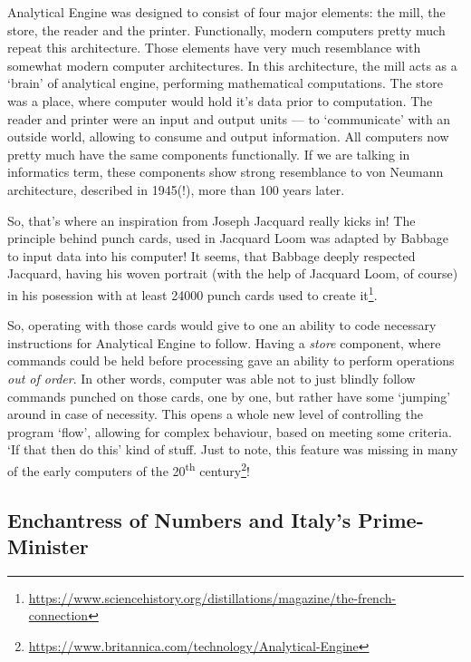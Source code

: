 \documentclass[../../what-is-computer]{subfiles}
\begin{document}
    Analytical Engine was designed to consist of four major elements: the mill, the store, the reader and the printer. Functionally, modern computers pretty much
    repeat this architecture. Those elements have very much resemblance with somewhat modern computer architectures. In this architecture, the mill acts as a `brain'
    of analytical engine, performing mathematical computations. The store was a place, where computer would hold it's data prior to computation. The reader and printer
    were an input and output units --- to `communicate' with an outside world, allowing to consume and output information. All computers now pretty much have the same 
    components functionally. If we are talking in informatics term, these components show strong resemblance to von Neumann architecture, described in 1945(!), more than
    100 years later. \par

    So, that's where an inspiration from Joseph Jacquard really kicks in! The principle behind punch cards, used in Jacquard Loom was adapted by Babbage to input data
    into his computer! It seems, that Babbage deeply respected Jacquard, having his woven portrait (with the help of Jacquard Loom, of course) in his 
    posession with at least \num{24000} punch cards used to create it\footnote{\href{https://www.sciencehistory.org/distillations/magazine/the-french-connection}
    {https://www.sciencehistory.org/distillations/magazine/the-french-connection}}. \par

    So, operating with those cards would give to one an ability to code necessary instructions for Analytical Engine to follow. Having a \emph{store} component, 
    where commands could be held before processing gave an ability to perform operations \emph{out of order}. In other words, computer was able not to just blindly
    follow commands punched on those cards, one by one, but rather have some `jumping' around in case of necessity. This opens a whole new level of controlling the
    program `flow', allowing for complex behaviour, based on meeting some criteria. `If that then do this' kind of stuff. Just to note, this feature was missing
    in many of the early computers of the 20\textsuperscript{th} century\footnote{\href{https://www.britannica.com/technology/Analytical-Engine}
    {https://www.britannica.com/technology/Analytical-Engine}}! \par

    \subsection{Enchantress of Numbers and Italy's Prime-Minister}\label{subsection:enchantress-of-numbers-and-italys-prime-minister}
\end{document}
